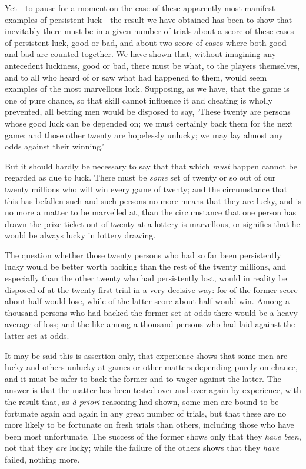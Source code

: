 \documentclass[letterpaper,12pt,oneside,openany]{memoir}
\begin{document}
Yet---to pause for a moment on the case of these
apparently most manifest examples of persistent luck---the
result we have obtained has been to show that
inevitably there must be in a given number of trials
about a score of these cases of persistent luck, good or
bad, and about two score of cases where both good and
bad are counted together. We have shown that, without
imagining any antecedent luckiness, good or bad, there
must be what, to the players themselves, and to all who
heard of or saw what had happened to them, would
seem examples of the most marvellous luck. Supposing,
as we have, that the game is one of pure chance, so that
skill cannot influence it and cheating is wholly prevented,
all betting men would be disposed to say, `These
twenty are persons whose good luck can be depended
on; we must certainly back them for the next game:
and those other twenty are hopelessly unlucky; we may
lay almost any odds against their winning.'

But it should hardly be necessary to say that that
which \textit{must} happen cannot be regarded as due to luck.
There must be \textit{some} set of twenty or so out of our twenty
millions who will win every game of twenty; and the
circumstance that this has befallen such and such persons
no more means that they are lucky, and is no more
a matter to be marvelled at, than the circumstance that
one person has drawn the prize ticket out of twenty
at a lottery is marvellous, or signifies that he would be
always lucky in lottery drawing.

The question whether those twenty persons who
had so far been persistently lucky would be better
worth backing than the rest of the twenty millions,
and especially than the other twenty who had persistently
lost, would in reality be disposed of at the
twenty-first trial in a very decisive way: for of the
former score about half would lose, while of the latter
score about half would win. Among a thousand persons
who had backed the former set at odds there would
be a heavy average of loss; and the like among a thousand
persons who had laid against the latter set at
odds.

It may be said this is assertion only, that experience
shows that some men are lucky and others unlucky at
games or other matters depending purely on chance,
and it must be safer to back the former and to wager
against the latter. The answer is that the matter has
been tested over and over again by experience, with the
result that, as \textit{\`a priori} reasoning had shown, some men
are bound to be fortunate again and again in any
great number of trials, but that these are no more likely
to be fortunate on fresh trials than others, including
those who have been most unfortunate. The success of
the former shows only that they \textit{have been}, not that they
\textit{are} lucky; while the failure of the others shows that
they \textit{have} failed, nothing more.
\end{document}
